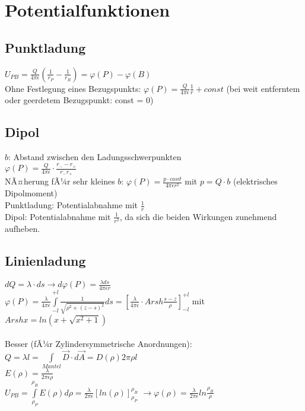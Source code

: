 \documentclass[a4paper,twoside,12pt]{report}
\begin{document}
\section{Potentialfunktionen}
\subsection{Punktladung}
$U_{PB} = \frac{Q}{4\pi\epsilon}(\frac{1}{r_P}-\frac{1}{r_B}) = \varphi(P)-\varphi(B)$\\
Ohne Festlegung eines Bezugspunkts: $\varphi(P) = \frac{Q}{4\pi\epsilon}\frac{1}{r} +const$ (bei weit entferntem oder geerdetem Bezugspunkt: const = 0)\\

\subsection{Dipol}
$b$: Abstand zwischen den Ladungsschwerpunkten\\
$\varphi(P) = \frac{Q}{4\pi\epsilon} \cdot \frac{r_- -r_+}{r_-r_+}$\\
NÃ¤herung fÃ¼r sehr kleines $b$: $\varphi(P) = \frac{p \cdot cos\vartheta}{4\pi\epsilon r^2}$ mit $ p = Q \cdot b$ (elektrisches Dipolmoment)\\
Punktladung: Potentialabnahme mit $\frac{1}{r}$\\
Dipol: Potentialabnahme mit $\frac{1}{r^2}$,  da sich die beiden Wirkungen zunehmend aufheben.\\

\subsection{Linienladung}
$dQ = \lambda \cdot ds \rightarrow d\varphi(P) = \frac{\lambda ds}{4\pi\epsilon r}$\\
$\varphi(P) = \frac{\lambda}{4\pi\epsilon}\int\limits_{-l}^{+l}{\frac{1}{\sqrt{\rho^2+(z-s)^2}}ds} = [\frac{\lambda}{4\pi\epsilon} \cdot Arsh \frac{s-z}{\rho}]_{-l}^{+l}$ mit $Arsh x = ln(x+\sqrt{x^2+1})$\\
\\
Besser (fÃ¼r Zylindersymmetrische Anordnungen):\\
$Q = \lambda l = \int\limits_{Mantel}{\vec{D} \cdot d\vec{A}} = D(\rho)2\pi\rho l$\\
$E(\rho) = \frac{\lambda}{2\pi\epsilon \rho}$\\
$U_{PB} = \int\limits_{\rho_P}^{\rho_B}{E(\rho)d\rho}= \frac{\lambda}{2\pi\epsilon}[ln(\rho)]_{\rho_P}^{\rho_B}$
$\rightarrow \varphi(\rho) = \frac{\lambda}{2\pi\epsilon}ln\frac{\rho_B}{\rho}$
\end{document}

